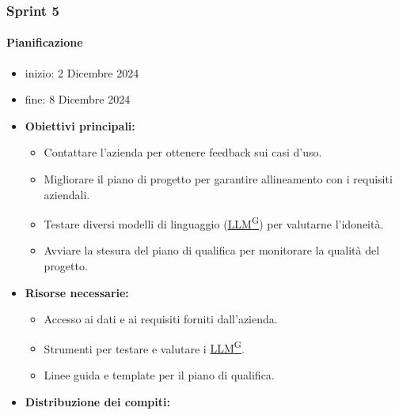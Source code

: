 \documentclass{article}
\begin{document}
            \subsubsection{Sprint 5}
                \paragraph{Pianificazione}
                \begin{itemize}
                    \item inizio: 2 Dicembre 2024
                    \item fine: 8 Dicembre 2024
                \end{itemize}
                \begin{itemize}
                    \item \textbf{Obiettivi principali:}
                    \begin{itemize}
                        \item Contattare l'azienda per ottenere feedback sui casi d'uso.
                        \item Migliorare il piano di progetto per garantire allineamento con i requisiti aziendali.
                        \item Testare diversi modelli di linguaggio (\href{https://code7crusaders.github.io/docs/RTB/documentazione_interna/glossario.html#llm-large-language-model}{LLM\textsuperscript{G}}) per valutarne l'idoneità.
                        \item Avviare la stesura del piano di qualifica per monitorare la qualità del progetto.
                    \end{itemize}
                    \item \textbf{Risorse necessarie:}
                    \begin{itemize}
                        \item Accesso ai dati e ai requisiti forniti dall'azienda.
                        \item Strumenti per testare e valutare i \href{https://code7crusaders.github.io/docs/RTB/documentazione_interna/glossario.html#llm-large-language-model}{LLM\textsuperscript{G}}.
                        \item Linee guida e template per il piano di qualifica.
                    \end{itemize}
                    \item \textbf{Distribuzione dei compiti:}
                    \begin{itemize}

\end{itemize}
\end{itemize}
\end{document}
